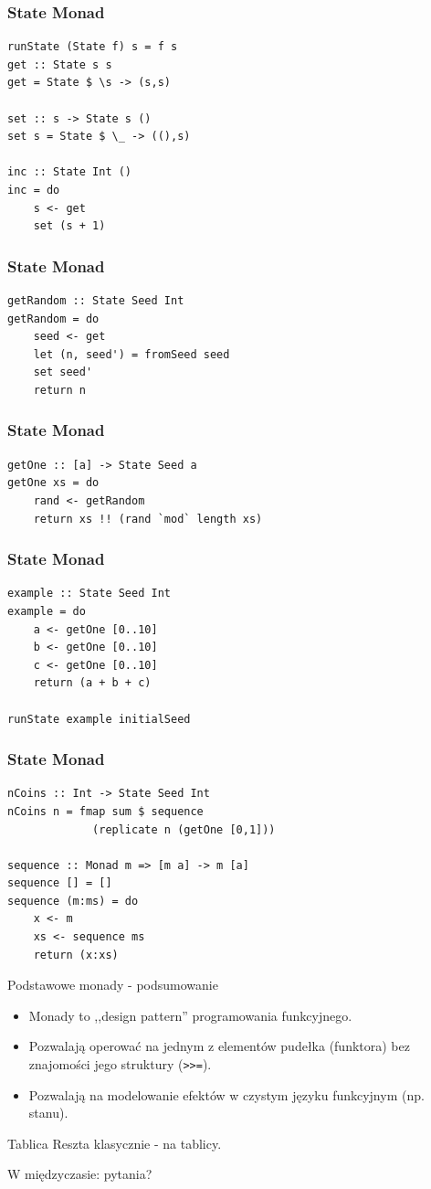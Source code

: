 \documentclass[14pt]{beamer}
\begin{document}
\begin{frame}[fragile]
\frametitle{State Monad}
\begin{verbatim}
runState (State f) s = f s
get :: State s s
get = State $ \s -> (s,s)

set :: s -> State s ()
set s = State $ \_ -> ((),s)

inc :: State Int ()
inc = do
    s <- get
    set (s + 1)
\end{verbatim}
\end{frame}

\begin{frame}[fragile]
\frametitle{State Monad}
\begin{verbatim}
getRandom :: State Seed Int
getRandom = do
    seed <- get
    let (n, seed') = fromSeed seed
    set seed'
    return n
\end{verbatim}
\end{frame}

\begin{frame}[fragile]
\frametitle{State Monad}
\begin{verbatim}
getOne :: [a] -> State Seed a
getOne xs = do
    rand <- getRandom
    return xs !! (rand `mod` length xs)
\end{verbatim}
\end{frame}

\begin{frame}[fragile]
\frametitle{State Monad}
\begin{verbatim}
example :: State Seed Int
example = do
    a <- getOne [0..10]
    b <- getOne [0..10]
    c <- getOne [0..10]
    return (a + b + c)

runState example initialSeed
\end{verbatim}
\end{frame}

\begin{frame}[fragile]
\frametitle{State Monad}
\begin{verbatim}
nCoins :: Int -> State Seed Int
nCoins n = fmap sum $ sequence 
             (replicate n (getOne [0,1]))

sequence :: Monad m => [m a] -> m [a]
sequence [] = []
sequence (m:ms) = do
    x <- m
    xs <- sequence ms
    return (x:xs)
\end{verbatim}
\end{frame}

\begin{frame}{Podstawowe monady - podsumowanie}
    \begin{itemize}
        \item Monady to ,,design pattern'' programowania funkcyjnego.
        \item Pozwalają operować na jednym z elementów pudełka (funktora) bez
            znajomości jego struktury (\texttt{>>=}).
        \item Pozwalają na modelowanie efektów w czystym języku funkcyjnym (np. stanu).
    \end{itemize}
\end{frame}

\begin{frame}{Tablica}
    Reszta klasycznie - na tablicy.

    W międzyczasie: pytania?
\end{frame}
\end{document}
